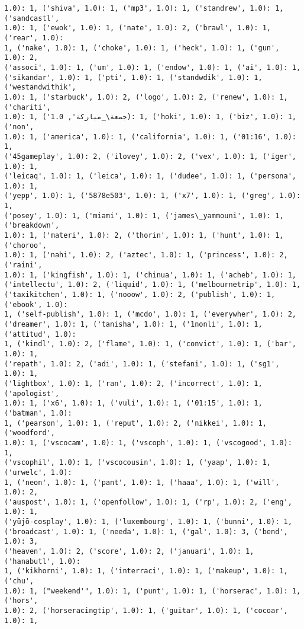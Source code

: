 \documentclass[11pt]{article}
\begin{document}
\begin{Verbatim}[commandchars=\\\{\}]
1.0): 1, ('shiva', 1.0): 1, ('mp3', 1.0): 1, ('standrew', 1.0): 1, ('sandcastl',
1.0): 1, ('ewok', 1.0): 1, ('nate', 1.0): 2, ('brawl', 1.0): 1, ('rear', 1.0):
1, ('nake', 1.0): 1, ('choke', 1.0): 1, ('heck', 1.0): 1, ('gun', 1.0): 2,
('associ', 1.0): 1, ('um', 1.0): 1, ('endow', 1.0): 1, ('ai', 1.0): 1,
('sikandar', 1.0): 1, ('pti', 1.0): 1, ('standwdik', 1.0): 1, ('westandwithik',
1.0): 1, ('starbuck', 1.0): 2, ('logo', 1.0): 2, ('renew', 1.0): 1, ('chariti',
1.0): 1, ('جمعة\_مباركة', 1.0): 1, ('hoki', 1.0): 1, ('biz', 1.0): 1, ('non',
1.0): 1, ('america', 1.0): 1, ('california', 1.0): 1, ('01:16', 1.0): 1,
('45gameplay', 1.0): 2, ('ilovey', 1.0): 2, ('vex', 1.0): 1, ('iger', 1.0): 1,
('leicaq', 1.0): 1, ('leica', 1.0): 1, ('dudee', 1.0): 1, ('persona', 1.0): 1,
('yepp', 1.0): 1, ('5878e503', 1.0): 1, ('x7', 1.0): 1, ('greg', 1.0): 1,
('posey', 1.0): 1, ('miami', 1.0): 1, ('james\_yammouni', 1.0): 1, ('breakdown',
1.0): 1, ('materi', 1.0): 2, ('thorin', 1.0): 1, ('hunt', 1.0): 1, ('choroo',
1.0): 1, ('nahi', 1.0): 2, ('aztec', 1.0): 1, ('princess', 1.0): 2, ('raini',
1.0): 1, ('kingfish', 1.0): 1, ('chinua', 1.0): 1, ('acheb', 1.0): 1,
('intellectu', 1.0): 2, ('liquid', 1.0): 1, ('melbournetrip', 1.0): 1,
('taxikitchen', 1.0): 1, ('nooow', 1.0): 2, ('publish', 1.0): 1, ('ebook', 1.0):
1, ('self-publish', 1.0): 1, ('mcdo', 1.0): 1, ('everywher', 1.0): 2,
('dreamer', 1.0): 1, ('tanisha', 1.0): 1, ('1nonli', 1.0): 1, ('attitud', 1.0):
1, ('kindl', 1.0): 2, ('flame', 1.0): 1, ('convict', 1.0): 1, ('bar', 1.0): 1,
('repath', 1.0): 2, ('adi', 1.0): 1, ('stefani', 1.0): 1, ('sg1', 1.0): 1,
('lightbox', 1.0): 1, ('ran', 1.0): 2, ('incorrect', 1.0): 1, ('apologist',
1.0): 1, ('x6', 1.0): 1, ('vuli', 1.0): 1, ('01:15', 1.0): 1, ('batman', 1.0):
1, ('pearson', 1.0): 1, ('reput', 1.0): 2, ('nikkei', 1.0): 1, ('woodford',
1.0): 1, ('vscocam', 1.0): 1, ('vscoph', 1.0): 1, ('vscogood', 1.0): 1,
('vscophil', 1.0): 1, ('vscocousin', 1.0): 1, ('yaap', 1.0): 1, ('urwelc', 1.0):
1, ('neon', 1.0): 1, ('pant', 1.0): 1, ('haaa', 1.0): 1, ('will', 1.0): 2,
('auspost', 1.0): 1, ('openfollow', 1.0): 1, ('rp', 1.0): 2, ('eng', 1.0): 1,
('yūjō-cosplay', 1.0): 1, ('luxembourg', 1.0): 1, ('bunni', 1.0): 1,
('broadcast', 1.0): 1, ('needa', 1.0): 1, ('gal', 1.0): 3, ('bend', 1.0): 3,
('heaven', 1.0): 2, ('score', 1.0): 2, ('januari', 1.0): 1, ('hanabutl', 1.0):
1, ('kikhorni', 1.0): 1, ('interraci', 1.0): 1, ('makeup', 1.0): 1, ('chu',
1.0): 1, ("weekend'", 1.0): 1, ('punt', 1.0): 1, ('horserac', 1.0): 1, ('hors',
1.0): 2, ('horseracingtip', 1.0): 1, ('guitar', 1.0): 1, ('cocoar', 1.0): 1,

\end{Verbatim}
\end{document}
